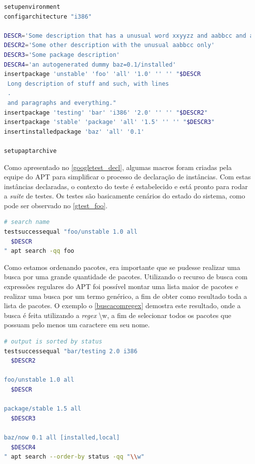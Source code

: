 \begin{lstlisting}[language=Bash,label=googletest_decl,caption={Declarações de instâncias para o teste}]
setupenvironment
configarchitecture "i386"

DESCR='Some description that has a unusual word xxyyzz and aabbcc and a UPPERCASE'
DESCR2='Some other description with the unusual aabbcc only'
DESCR3='Some package description'
DESCR4='an autogenerated dummy baz=0.1/installed'
insertpackage 'unstable' 'foo' 'all' '1.0' '' '' "$DESCR
 Long description of stuff and such, with lines
 .
 and paragraphs and everything."
insertpackage 'testing' 'bar' 'i386' '2.0' '' '' "$DESCR2"
insertpackage 'stable' 'package' 'all' '1.5' '' '' "$DESCR3"
insertinstalledpackage 'baz' 'all' '0.1'

setupaptarchive
\end{lstlisting}

Como apresentado no \autoref{googletest_decl}, algumas macros foram criadas pela equipe do {\code APT} para simplificar o processo de declaração de instâncias. Com estas instâncias declaradas, o contexto do teste é estabelecido e está pronto para rodar a \textit{suite} de testes. Os testes são basicamente cenários do estado do sistema, como pode ser observado no \autoref{gtest_foo}.

\begin{lstlisting}[language=Bash,label=gtest_foo,caption={Teste de busca pelo pacote \textit{foo}}]
# search name
testsuccessequal "foo/unstable 1.0 all
  $DESCR
" apt search -qq foo
\end{lstlisting}

Como estamos ordenando pacotes, era importante que se pudesse realizar uma busca por uma grande quantidade de pacotes. Utilizando o recurso de busca com expressões regulares do APT foi possível montar uma lista maior de pacotes e realizar uma busca por um termo genérico, a fim de obter como resultado toda a lista de pacotes. O exemplo o \autoref{buscacomregex} demostra este resultado, onde a busca é feita utilizando a \textit{regex} {\code \textbackslash w}, a fim de selecionar todos os pacotes que possuam pelo menos um caractere em seu nome.

\begin{lstlisting}[language=Bash,label=buscacomregex,caption={Busca com uso de expressão regular}]
# output is sorted by status
testsuccessequal "bar/testing 2.0 i386
  $DESCR2

foo/unstable 1.0 all
  $DESCR

package/stable 1.5 all
  $DESCR3

baz/now 0.1 all [installed,local]
  $DESCR4
" apt search --order-by status -qq "\\w"
\end{lstlisting}

